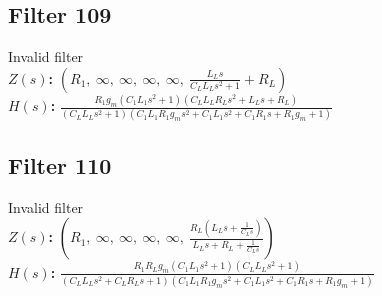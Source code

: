 \documentclass{article}
\begin{document}
\subsection*{Filter 109}
Invalid filter \\ 
\textbf{$Z(s)$:} $\left( R_{1}, \  \infty, \  \infty, \  \infty, \  \infty, \  \frac{L_{L} s}{C_{L} L_{L} s^{2} + 1} + R_{L}\right)$ \\ 
\textbf{$H(s)$:} $\frac{R_{1} g_{m} \left(C_{1} L_{1} s^{2} + 1\right) \left(C_{L} L_{L} R_{L} s^{2} + L_{L} s + R_{L}\right)}{\left(C_{L} L_{L} s^{2} + 1\right) \left(C_{1} L_{1} R_{1} g_{m} s^{2} + C_{1} L_{1} s^{2} + C_{1} R_{1} s + R_{1} g_{m} + 1\right)}$ \\ 
\subsection*{Filter 110}
Invalid filter \\ 
\textbf{$Z(s)$:} $\left( R_{1}, \  \infty, \  \infty, \  \infty, \  \infty, \  \frac{R_{L} \left(L_{L} s + \frac{1}{C_{L} s}\right)}{L_{L} s + R_{L} + \frac{1}{C_{L} s}}\right)$ \\ 
\textbf{$H(s)$:} $\frac{R_{1} R_{L} g_{m} \left(C_{1} L_{1} s^{2} + 1\right) \left(C_{L} L_{L} s^{2} + 1\right)}{\left(C_{L} L_{L} s^{2} + C_{L} R_{L} s + 1\right) \left(C_{1} L_{1} R_{1} g_{m} s^{2} + C_{1} L_{1} s^{2} + C_{1} R_{1} s + R_{1} g_{m} + 1\right)}$ \\ 
\end{document}
